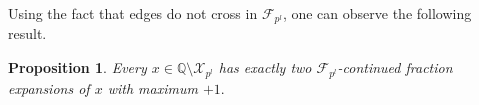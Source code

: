 \documentclass[12pt]{elsarticle}
\newtheorem{proposition}[theorem]{Proposition}
\theoremstyle{definition}
\newcommand{\field}[1]{\mathbb{#1}}          \newcommand{\Q}{\field{Q}}
\newcommand{\N}{\field{N}}
\newcommand{\mX}{{\mathcal X}}
\newcommand{\f}{{\mathcal F}}
\begin{document}
{Using the fact that edges do not cross in $\f_{p^l}$, one can observe the following result.
  \begin{proposition}
  		Every $x\in\Q\setminus\mX_{p^l}$ has exactly two $\f_{p^l}$-continued fraction expansions  of $x$ with maximum $+1.$
  	\end{proposition}
%  		
}
\end{document}
